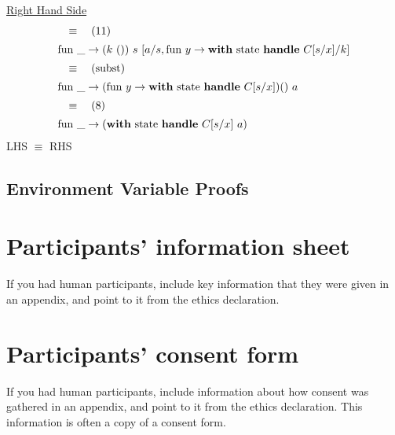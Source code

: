\documentclass[logo,bsc,singlespacing,parskip]{infthesis}
\begin{document}
\underline{Right Hand Side}
\[ 
\begin{array}{l}
\quad\equiv\quad (11) \\[5pt]
\text{fun }\_ \rightarrow (k\ ())\ s\ [a/s, \text{fun } y \rightarrow \text{\textbf{with} state \textbf{handle} } C[s/x]/k] \\[5pt]
\quad\equiv\quad (\text{subst}) \\[5pt]
\text{fun }\_ \rightarrow (\text{fun } y \rightarrow \text{\textbf{with} state \textbf{handle} } C[s/x]) ()\ a \\[5pt]
\quad\equiv\quad (8) \\[5pt]
\text{fun }\_ \rightarrow (\text{\textbf{with} state \textbf{handle} } C[s/x]\ a)
\end{array}
\]
LHS $\equiv$ RHS

\section{Environment Variable Proofs} \label{environment-variable-proofs}

\chapter{Participants' information sheet}

If you had human participants, include key information that they were given in
an appendix, and point to it from the ethics declaration.

\chapter{Participants' consent form}

If you had human participants, include information about how consent was
gathered in an appendix, and point to it from the ethics declaration.
This information is often a copy of a consent form.
\end{document}

